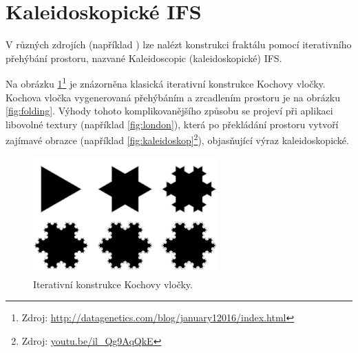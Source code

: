 \documentclass[thesis=B, czech]{FITthesis}[2019/03/06]
\begin{document}

\newpage

\section{Kaleidoskopické IFS}\label{kaleidoscope}


V různých zdrojích (například \cite{fractalForums,roy}) lze nalézt konstrukci fraktálu pomocí iterativního přehýbání prostoru, nazvané Kaleidoscopic (kaleidoskopické) IFS.

Na obrázku \ref{fig:koch}\footnote{Zdroj: \url{http://datagenetics.com/blog/january12016/index.html}} je znázorněna klasická iterativní konstrukce Kochovy vločky. Kochova vločka vygenerovaná přehýbáním a zrcadlením prostoru je na obrázku \ref{fig:folding}. Výhody tohoto komplikovanějšího způsobu se projeví při aplikaci libovolné textury (například \ref{fig:london}), která po překládání prostoru vytvoří zajímavé obrazce (například \ref{fig:kaleidoskop}\footnote{Zdroj: \url{youtu.be/il_Qg9AqQkE}}), objasňující výraz kaleidoskopické.




\begin{figure}[h]
    \centering
    \includegraphics[width=200pt]{images/kp.png}
        \caption{Iterativní konstrukce Kochovy vločky.}
        \label{fig:koch}
\end{figure}
\end{document}
